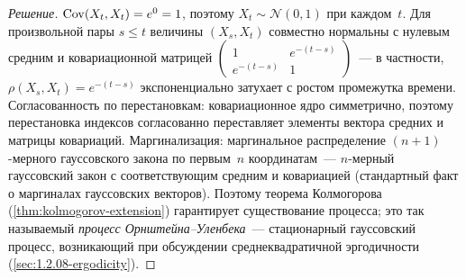 \begin{proof}[Решение]
$\operatorname{Cov}(X_t, X_t) = e^{0} = 1$, поэтому $X_t \sim \mathcal{N}(0, 1)$ при каждом~$t$. Для произвольной пары $s \leq t$ величины $(X_s, X_t)$ совместно нормальны с нулевым средним и ковариационной матрицей $\begin{pmatrix} 1 & e^{-(t - s)} \\ e^{-(t - s)} & 1 \end{pmatrix}$~--- в частности, $\rho(X_s, X_t) = e^{-(t - s)}$ экспоненциально затухает с ростом промежутка времени. Согласованность по перестановкам: ковариационное ядро симметрично, поэтому перестановка индексов согласованно переставляет элементы вектора средних и матрицы ковариаций. Маргинализация: маргинальное распределение $(n+1)$-мерного гауссовского закона по первым~$n$ координатам~--- $n$-мерный гауссовский закон с соответствующим средним и ковариацией (стандартный факт о маргиналах гауссовских векторов). Поэтому теорема Колмогорова (\cref{thm:kolmogorov-extension}) гарантирует существование процесса; это так называемый \emph{процесс Орнштейна--Уленбека}~--- стационарный гауссовский процесс, возникающий при обсуждении среднеквадратичной эргодичности (\cref{sec:1.2.08-ergodicity}).
\end{proof}
